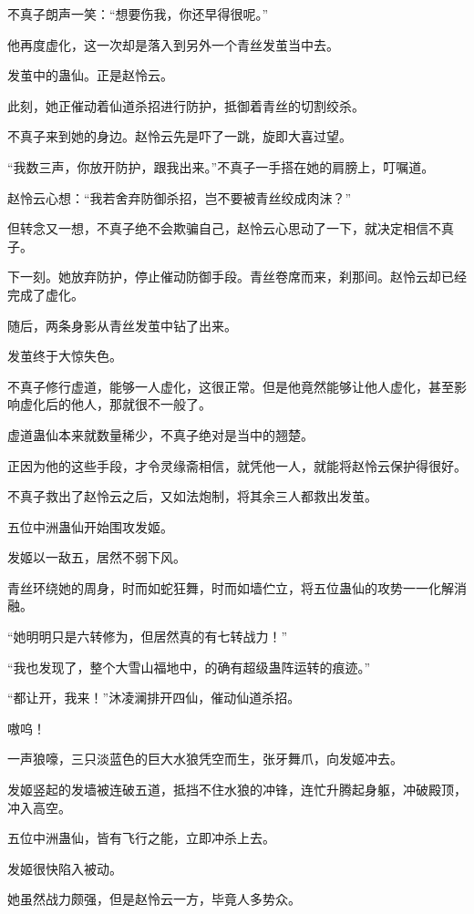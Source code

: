 \begin{this_body}
不真子朗声一笑：“想要伤我，你还早得很呢。”

他再度虚化，这一次却是落入到另外一个青丝发茧当中去。

发茧中的蛊仙。正是赵怜云。

此刻，她正催动着仙道杀招进行防护，抵御着青丝的切割绞杀。

不真子来到她的身边。赵怜云先是吓了一跳，旋即大喜过望。

“我数三声，你放开防护，跟我出来。”不真子一手搭在她的肩膀上，叮嘱道。

赵怜云心想：“我若舍弃防御杀招，岂不要被青丝绞成肉沫？”

但转念又一想，不真子绝不会欺骗自己，赵怜云心思动了一下，就决定相信不真子。

下一刻。她放弃防护，停止催动防御手段。青丝卷席而来，刹那间。赵怜云却已经完成了虚化。

随后，两条身影从青丝发茧中钻了出来。

发茧终于大惊失色。

不真子修行虚道，能够一人虚化，这很正常。但是他竟然能够让他人虚化，甚至影响虚化后的他人，那就很不一般了。

虚道蛊仙本来就数量稀少，不真子绝对是当中的翘楚。

正因为他的这些手段，才令灵缘斋相信，就凭他一人，就能将赵怜云保护得很好。

不真子救出了赵怜云之后，又如法炮制，将其余三人都救出发茧。

五位中洲蛊仙开始围攻发姬。

发姬以一敌五，居然不弱下风。

青丝环绕她的周身，时而如蛇狂舞，时而如墙伫立，将五位蛊仙的攻势一一化解消融。

“她明明只是六转修为，但居然真的有七转战力！”

“我也发现了，整个大雪山福地中，的确有超级蛊阵运转的痕迹。”

“都让开，我来！”沐凌澜排开四仙，催动仙道杀招。

嗷呜！

一声狼嚎，三只淡蓝色的巨大水狼凭空而生，张牙舞爪，向发姬冲去。

发姬竖起的发墙被连破五道，抵挡不住水狼的冲锋，连忙升腾起身躯，冲破殿顶，冲入高空。

五位中洲蛊仙，皆有飞行之能，立即冲杀上去。

发姬很快陷入被动。

她虽然战力颇强，但是赵怜云一方，毕竟人多势众。


\end{this_body}
